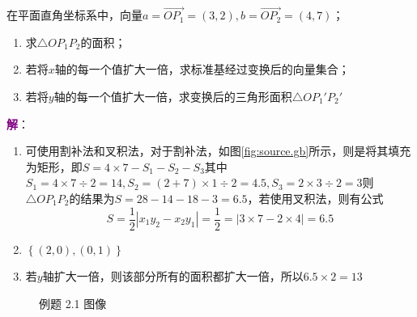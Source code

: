 \begin{example}
	\label{exam:scale}
	在平面直角坐标系中，向量$a=\overrightarrow{OP_1}=(3,2),b=\overrightarrow{OP_2}=(4,7)$；
	\begin{enumerate}
		\item 求$\triangle OP_1P_2$的面积；
		\item 若将$x$轴的每一个值扩大一倍，求标准基经过变换后的向量集合；
		\item 若将$y$轴的每一个值扩大一倍，求变换后的三角形面积$\triangle OP_1'P_2'$
	\end{enumerate}
	\tcblower
	\textcolor{purple}{\textbf{解}}：
	\begin{enumerate}
		\item 可使用割补法和叉积法，对于割补法，如图\ref{fig:source.gb}所示，则是将其填充为矩形，即$S=4\times 7-S_1-S_2-S_3$其中$S_1=4\times 7\div 2=14,S_2=(2+7)\times 1 \div 2=4.5,S_3=2\times 3 \div 2 =3$则$\triangle OP_1P_2$的结果为$S=28-14-18-3=6.5$，若使用叉积法，则有公式$$S=\frac{1}{2}\left| x_1y_2-x_2y_1 \right|=\frac{1}{2}=\left| 3\times 7-2\times 4 \right|=6.5$$
		\item $\left\{ (2,0),(0,1) \right\}$
		\item 若$y$轴扩大一倍，则该部分所有的面积都扩大一倍，所以$6.5\times 2=13$
	\end{enumerate}
\end{example}

\begin{figure}[htbp]    %
	\centering            %
	\caption{例题 2.1 图像}    %
	\label{fig:pic.21}            %
\end{figure}


